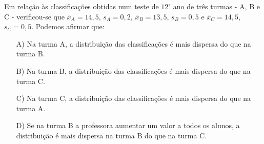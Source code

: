 Em relação às classificações obtidas num teste de $12^{\circ}$ ano de três turmas - A, B e C - verificou-se que $\overline{x}_A = 14,5$, $s_A = 0,2$, $\overline{x}_B = 13,5$, $s_B = 0,5$ e $\overline{x}_C = 14,5$, $s_C = 0,5$. Podemos afirmar que:
\begin{enumerate}
\item [A)] Na turma A, a distribuição das classificações é mais dispersa do que na turma B.
\item [B)] Na turma B, a distribuição das classificações é mais dispersa do que na turma C.
\item [C)] Na turma C, a distribuição das classificações é mais dispersa do que na turma A.
\item [D)] Se na turma B a professora aumentar um valor a todos os alunos, a distribuição é mais dispersa na turma B do que na turma C.
\end{enumerate}
